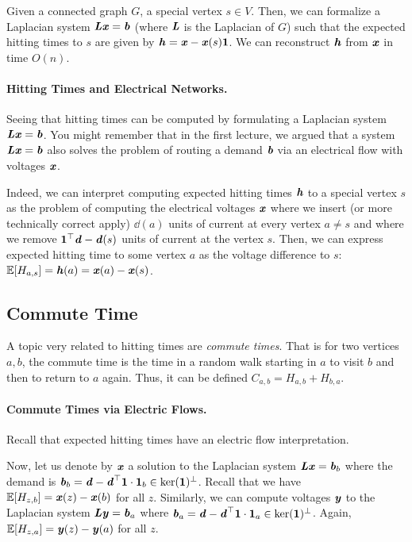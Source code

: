 \begin{theorem}
	Given a connected graph $G$, a special vertex $s \in V$. Then, we can formalize a Laplacian system $\boldsymbol{\mathit{L}} \boldsymbol{\mathit{x}} = \boldsymbol{\mathit{b}}$ (where $\boldsymbol{\mathit{L}}$ is the Laplacian of $G$) such that the expected hitting times to $s$ are given by ${\boldsymbol{\mathit{h}}} = \boldsymbol{\mathit{x}} - \boldsymbol{\mathit{x}}(s) \boldsymbol{1}$. We can reconstruct ${\boldsymbol{\mathit{h}}}$ from $\boldsymbol{\mathit{x}}$ in time $O(n)$.
\end{theorem}

\paragraph{Hitting Times and Electrical Networks.} Seeing that hitting times can be computed by formulating a Laplacian system $\boldsymbol{\mathit{L}} \boldsymbol{\mathit{x}} = \boldsymbol{\mathit{b}}$. You might remember that in the first lecture, we argued that a system $\boldsymbol{\mathit{L}} \boldsymbol{\mathit{x}} = \boldsymbol{\mathit{b}}$ also solves the problem of routing a demand $\boldsymbol{\mathit{b}}$ via an electrical flow with voltages $\boldsymbol{\mathit{x}}$. 

Indeed, we can interpret computing expected hitting times ${\boldsymbol{\mathit{h}}}$ to a special vertex $s$ as the problem of computing the electrical voltages $\boldsymbol{\mathit{x}}$ where we insert (or more technically correct apply) $\dd(a)$ units of current at every vertex $a \neq s$ and where we remove $\boldsymbol{1}^\top\boldsymbol{\mathit{d}} - \boldsymbol{\mathit{d}}(s)$ units of current at the vertex $s$. Then, we can express expected hitting time to some vertex $a$ as the voltage difference to $s$: $\mathbb{E}[H_{a,s}] = {\boldsymbol{\mathit{h}}}(a) = \boldsymbol{\mathit{x}}(a) - \boldsymbol{\mathit{x}}(s)$.

\subsection{Commute Time}

A topic very related to hitting times are \emph{commute times}. That is for two vertices $a,b$, the commute time is the time in a random walk starting in $a$ to visit $b$ and then to return to $a$ again. Thus, it can be defined $C_{a,b} = H_{a,b} + H_{b,a}$.

\paragraph{Commute Times via Electric Flows.} Recall that expected hitting times have an electric flow interpretation. 

Now, let us denote by $\boldsymbol{\mathit{x}}$ a solution to the Laplacian system $\boldsymbol{\mathit{L}} \boldsymbol{\mathit{x}} = \boldsymbol{\mathit{b}}_b$ where the demand is $\boldsymbol{\mathit{b}}_b = \boldsymbol{\mathit{d}} - \boldsymbol{\mathit{d}}^\top \boldsymbol{1} \cdot \boldsymbol{1}_b \in \ker(\boldsymbol{1})^\perp$. Recall that we have $\mathbb{E}[H_{z,b}] = \boldsymbol{\mathit{x}}(z) - \boldsymbol{\mathit{x}}(b)$ for all $z$. Similarly, we can compute voltages $\boldsymbol{\mathit{y}}$ to the Laplacian system $\boldsymbol{\mathit{L}} \boldsymbol{\mathit{y}} = \boldsymbol{\mathit{b}}_a$ where $\boldsymbol{\mathit{b}}_a = \boldsymbol{\mathit{d}} - \boldsymbol{\mathit{d}}^\top \boldsymbol{1} \cdot \boldsymbol{1}_a \in \ker(\boldsymbol{1})^\perp$. Again, $\mathbb{E}[H_{z,a}] = \boldsymbol{\mathit{y}}(z) - \boldsymbol{\mathit{y}}(a)$ for all $z$.

